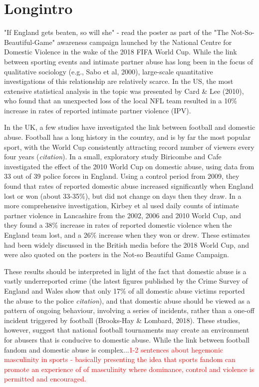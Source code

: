 \documentclass[12pt, letterpaper]{article}
\begin{document}
\section{Longintro}

"If England gets beaten, so will she" - read the poster as part of the "The Not-So-Beautiful-Game" awareness campaign launched by the National Centre for Domestic Violence in the wake of the 2018 FIFA World Cup. While the link between sporting events and intimate partner abuse has long been in the focus of qualitative sociology (e.g., Sabo et al, 2000), large-scale quantitative investigations of this relationship are relatively scarce. In the US, the most extensive statistical analysis in the topic was presented by Card \& Lee (2010), who found that an unexpected loss of the local NFL team resulted in a 10\% increase in rates of reported intimate partner violence (IPV).

In the UK, a few studies have investigated the link between football and domestic abuse. Football has a long history in the country, and is by far the most popular sport, with the World Cup consistently attracting record number of viewers every four years (\textit{citation}). In a small, exploratory study Biricombe and Cafe investigated the effect of the 2010 World Cup on domestic abuse, using data from 33 out of 39 police forces in England. Using a control period from 2009, they found that rates of reported domestic abuse increased significantly when England lost or won (about 33-35\%), but did not change on days then they draw. In a more comprehensive investigation, Kirbey et al used daily counts of intimate partner violence in Lancashire from the 2002, 2006 and 2010 World Cup, and they found a 38\% increase in rates of reported domestic violence when the England team lost, and a 26\% increase when they won or drew. These estimates had been widely discussed in the British media before the 2018 World Cup, and were also quoted on the posters in the Not-so Beautiful Game Campaign.  

These results should be interpreted in light of the fact that domestic abuse is a vastly underreported crime (the latest figures published by the Crime Survey of England and Wales show that only 17\% of all domestic abuse victims reported the abuse to the police \textit{citation}), and that domestic abuse should be viewed as a pattern of ongoing behaviour, involving a series of incidents, rather than a one-off incident triggered by football (Brooks-Hay \& Lombard, 2018). These studies, however, suggest that national football tournaments may create an environment for abusers that is conducive to domestic abuse. While the link between football fandom and domestic abuse is complex...\textcolor{red}{1-2 sentences about hegemonic masculinity in sports - basically presenting the idea that sports fandom can promote an experience of of masculinity where dominance, control and violence is permitted and encouraged.}
\end{document}
